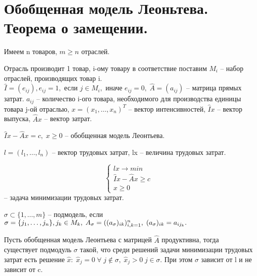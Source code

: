 \chapter{Обобщенная модель Леоньтева. Теорема о замещении.}\label{cha:11}

Имеем n товаров, $m \geq n$ отраслей.

Отрасль производит 1 товар, i-ому товару в соответствие поставим $M_i$ -- набор отраслей, производящих товар i. $\hat{I} = (e_{ij}), e_{ij} = 1, \text{ если } j \in M_i, \text{ иначе } e_{ij} = 0, \; \hat{A} = (a_{ij})$ -- матрица прямых затрат. $a_{ij}$ -- количество i-ого товара, необходимого для производства единицы товара j-ой отраслью, $x = (x_1, \ldots, x_n)^T$ -- вектор интенсивностей, $\hat{I}x$ -- вектор выпуска, $\hat{A}x$ -- вектор затрат.

\begin{definition}
	$\hat{I}x - \hat{A}x = c, \; x \geq 0$ -- обобщенная модель Леонтьева.
\end{definition}

\begin{definition}
	$l = (l_1, \ldots, l_n)$ -- вектор трудовых затрат, lx -- величина трудовых затрат.
\end{definition}

\begin{problem}
	$$\begin{cases}
		lx \to min\\
		\hat{I}x - \hat{A}x \geq c\\
		x \geq 0
	\end{cases}$$ -- задача минимизации трудовых затрат.
\end{problem}

\begin{definition}[Подмодель]
	$\sigma \subset \{1, \ldots, m \}$ -- подмодель, если $\sigma = \{j_1, \ldots, j_n \},\\ 
	j_k \in M_k, \; A_{\sigma} = ((a_{\sigma})_{ik})_{i,k = 1}^n, \; (a_{\sigma})_{ik} = a_{ij_k}.$
\end{definition}

\begin{theorem}
	Пусть обобщенная модель Леонтьева с матрицей $\hat{A}$ продуктивна, тогда существует подмодуль $\sigma$ такой, что среди решений задачи минимизации трудовых затрат есть решение $\hat{x}: \; \hat{x}_j = 0 \; \forall \; j \notin \sigma, \; \hat{x}_j > 0 \; j \in \sigma.$ При этом $\sigma$ зависит от l и не зависит от c.
\end{theorem}